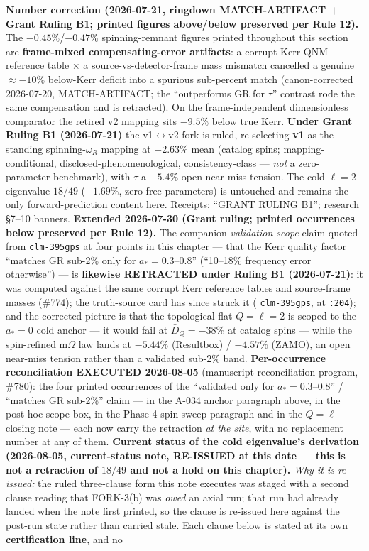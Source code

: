 \noindent\textbf{Number correction (2026-07-21, ringdown MATCH-ARTIFACT + Grant Ruling B1; printed figures above/below preserved per Rule 12).} The $-0.45\%$/$-0.47\%$ spinning-remnant figures printed throughout this section are \textbf{frame-mixed compensating-error artifacts}: a corrupt Kerr QNM reference table $\times$ a source-vs-detector-frame mass mismatch cancelled a genuine $\approx -10\%$ below-Kerr deficit into a spurious sub-percent match (canon-corrected 2026-07-20, MATCH-ARTIFACT; the ``outperforms GR for $\tau$'' contrast rode the same compensation and is retracted). On the frame-independent dimensionless comparator the retired v2 mapping sits $-9.5\%$ below true Kerr. \textbf{Under Grant Ruling B1 (2026-07-21)} the v1$\leftrightarrow$v2 fork is ruled, re-selecting \textbf{v1} as the standing spinning-$\omega_R$ mapping at $+2.63\%$ mean (catalog spins; mapping-conditional, disclosed-phenomenological, consistency-class --- \emph{not} a zero-parameter benchmark), with $\tau$ a $-5.4\%$ open near-miss tension. The cold $\ell=2$ eigenvalue $18/49$ ($-1.69\%$, zero free parameters) is untouched and remains the only forward-prediction content here. Receipts:  ``GRANT RULING B1''; research  \S 7--10 banners. \textbf{Extended 2026-07-30 (Grant ruling; printed occurrences below preserved per Rule 12).} The companion \emph{validation-scope} claim quoted from \texttt{clm-395gps} at four points in this chapter --- that the Kerr quality factor ``matches GR sub-2\% only for $a_* = 0.3$--$0.8$'' (``10--18\% frequency error otherwise'') --- is \textbf{likewise RETRACTED under Ruling B1 (2026-07-21)}: it was computed against the same corrupt Kerr reference tables and source-frame masses (\#774); the truth-source card has since struck it ( \texttt{clm-395gps}, at \texttt{:204}); and the corrected picture is that the topological flat $Q = \ell = 2$ is scoped to the $a_* = 0$ cold anchor --- it would fail at $\bar{D}_Q = -38\%$ at catalog spins --- while the spin-refined m$\Omega$ law lands at $-5.44\%$ (Resultbox) / $-4.57\%$ (ZAMO), an open near-miss tension rather than a validated sub-2\% band. \textbf{Per-occurrence reconciliation EXECUTED 2026-08-05} (manuscript-reconciliation program, \#780): the four printed occurrences of the ``validated only for $a_* = 0.3$--$0.8$'' / ``matches GR sub-2\%'' claim --- in the A-034 anchor paragraph above, in the post-hoc-scope box, in the Phase-4 spin-sweep paragraph and in the $Q = \ell$ closing note --- each now carry the retraction \emph{at the site}, with no replacement number at any of them. \textbf{Current status of the cold eigenvalue's derivation (2026-08-05, current-status note, \textbf{RE-ISSUED} at this date --- this is not a retraction of $18/49$ and not a hold on this chapter).} \emph{Why it is re-issued:} the ruled three-clause form this note executes was staged with a second clause reading that FORK-3(b) was \emph{owed} an axial run; that run had already landed when the note first printed, so the clause is re-issued here against the post-run state rather than carried stale. Each clause below is stated at its own \textbf{certification line}, and no 